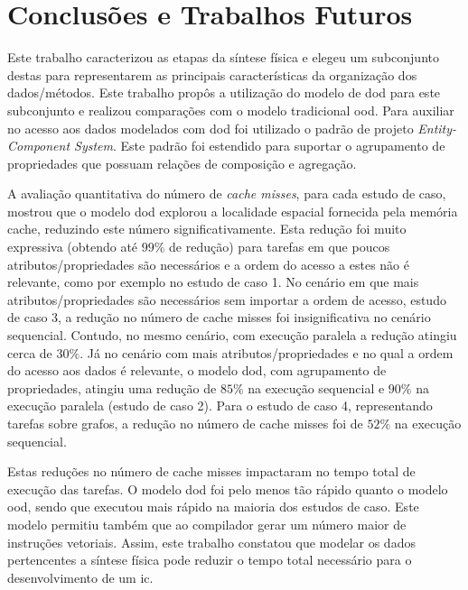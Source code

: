 
\chapter{Conclusões e Trabalhos Futuros}
\label{cap:conclusao_e_trabalhos_futuros}

    


Este trabalho caracterizou as etapas da síntese física e elegeu um subconjunto destas para representarem as principais características da organização dos dados/métodos.
Este trabalho propôs a utilização do modelo de \ac{dod} para este subconjunto e realizou comparações com o modelo tradicional \ac{ood}.
Para auxiliar no acesso aos dados modelados com \ac{dod} foi utilizado o padrão de projeto \textit{Entity-Component System}.
Este padrão foi estendido para suportar o agrupamento de propriedades que possuam relações de composição e agregação.

A avaliação quantitativa do número de \textit{cache misses}, para cada estudo de caso, mostrou que o modelo \ac{dod} explorou a localidade espacial fornecida pela memória cache, reduzindo este número significativamente.
Esta redução foi muito expressiva (obtendo até $99\%$ de redução) para tarefas em que poucos atributos/propriedades são necessários e a ordem do acesso a estes não é relevante, como por exemplo no estudo de caso 1.
No cenário em que mais atributos/propriedades são necessários sem importar a ordem de acesso, estudo de caso 3, a redução no número de cache misses foi insignificativa no cenário sequencial.
Contudo, no mesmo cenário, com execução paralela         a redução atingiu cerca de $30\%$.
Já no cenário com mais atributos/propriedades e no qual a ordem do acesso aos dados é relevante, o modelo \ac{dod}, com agrupamento de propriedades, atingiu uma redução de $85\%$ na execução sequencial e $90\%$ na execução paralela (estudo de caso 2).
Para o estudo de caso 4, representando tarefas sobre grafos, a redução no número de cache misses foi de $52\%$ na execução sequencial.

Estas reduções no número de cache misses impactaram no tempo total de execução das tarefas.
O modelo \ac{dod} foi pelo menos tão rápido quanto o modelo \ac{ood}, sendo que executou mais rápido na maioria dos estudos de caso.
Este modelo permitiu também que ao compilador gerar um número maior de instruções vetoriais.
Assim, este trabalho constatou que modelar os dados pertencentes a síntese física pode reduzir o tempo total necessário para o desenvolvimento de um \ac{ic}.

